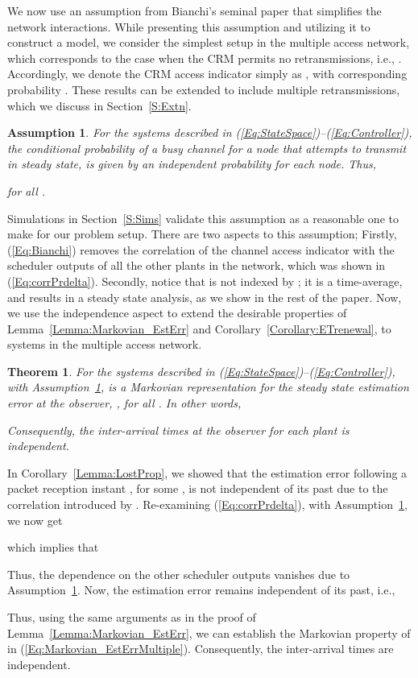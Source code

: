 \documentclass[journal]{IEEEtran}
\newtheorem{theorem}{Theorem}[section]
\newtheorem{assumption}{Assumption}[section]
\begin{document}
We now use an assumption from Bianchi's seminal paper \cite{Bianchi2000} that simplifies the network interactions. While presenting this assumption and utilizing it to construct a model, we consider the simplest setup in the multiple access network, which corresponds to the case when the CRM permits no retransmissions, i.e., . Accordingly, we denote the CRM access indicator  simply as , with corresponding probability . These results can be extended to include multiple retransmissions, which we discuss in Section~\ref{S:Extn}.

\begin{assumption} \label{Assumption:Bianchi}
For the systems described in (\ref{Eq:StateSpace})--(\ref{Eq:Controller}), the conditional probability of a busy channel for a node that attempts to transmit in steady state, is given by an independent probability  for each node. Thus,

for all .
\end{assumption}

Simulations in Section~\ref{S:Sims} validate this assumption as a reasonable one to make for our problem setup. There are two aspects to this assumption; Firstly, (\ref{Eq:Bianchi}) removes the correlation of the channel access indicator  with the scheduler outputs of all the other plants in the network, which was shown in (\ref{Eq:corrPrdelta}). Secondly, notice that  is not indexed by ; it is a time-average, and results in a steady state analysis, as we show in the rest of the paper. Now, we use the independence aspect to extend the desirable properties of Lemma~\ref{Lemma:Markovian_EstErr} and Corollary~\ref{Corollary:ETrenewal}, to systems in the multiple access network.

\begin{theorem} \label{Theorem:Markovian_EstErr}
For the systems described in (\ref{Eq:StateSpace})--(\ref{Eq:Controller}), with Assumption~\ref{Assumption:Bianchi},  is a Markovian representation for the steady state estimation error at the observer, , for all . In other words,

Consequently, the inter-arrival times at the observer for each plant is independent.
\end{theorem}
\begin{IEEEproof}
In Corollary~\ref{Lemma:LostProp}, we showed that the estimation error following a packet reception instant , for some , is not independent of its past due to the correlation introduced by . Re-examining (\ref{Eq:corrPrdelta}), with Assumption~\ref{Assumption:Bianchi}, we now get

which implies that

Thus, the dependence on the other scheduler outputs vanishes due to Assumption~\ref{Assumption:Bianchi}. Now, the estimation error remains independent of its past, i.e.,

Thus, using the same arguments as in the proof of Lemma~\ref{Lemma:Markovian_EstErr}, we can establish the Markovian property of  in (\ref{Eq:Markovian_EstErrMultiple}). Consequently, the inter-arrival times are independent.
\end{IEEEproof}
\end{document}

